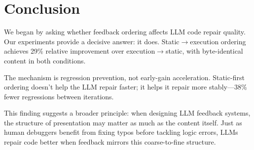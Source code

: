 \section{Conclusion}
\label{sec:conclusion}

We began by asking whether feedback ordering affects LLM code repair quality. Our experiments provide a decisive answer: it does. Static$\rightarrow$execution ordering achieves 29\% relative improvement over execution$\rightarrow$static, with byte-identical content in both conditions.

The mechanism is regression prevention, not early-gain acceleration. Static-first ordering doesn't help the LLM repair faster; it helps it repair more stably---38\% fewer regressions between iterations.

This finding suggests a broader principle: when designing LLM feedback systems, the structure of presentation may matter as much as the content itself. Just as human debuggers benefit from fixing typos before tackling logic errors, LLMs repair code better when feedback mirrors this coarse-to-fine structure.
